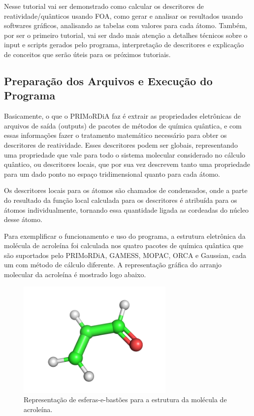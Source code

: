 \documentclass[a4paper,11pt]{refart}
\begin{document}
Nesse tutorial vai ser demonstrado como calcular os descritores de reatividade/quânticos usando FOA, como gerar e analisar os resultados usando softwares gráficos, analisando as tabelas com valores para cada átomo. Também, por ser o primeiro tutorial, vai ser dado mais atenção a detalhes técnicos sobre o input e scripts gerados pelo programa, interpretação de descritores e explicação de conceitos que serão úteis para os próximos tutoriais.

\subsection{Preparação dos Arquivos e Execução do Programa}

Basicamente, o que o PRIMoRDiA faz é extrair as propriedades eletrônicas de arquivos de saída (outputs) de pacotes de métodos de química quântica, e com essas informações fazer o tratamento matemático necessário para obter os descritores de reatividade. Esses descritores podem ser globais, representando uma propriedade que vale para todo o sistema molecular considerado no cálculo quântico, ou descritores locais, que por sua vez descrevem tanto uma propriedade para um dado ponto no espaço tridimensional quanto para cada átomo. 

Os descritores locais para os átomos são chamados de condensados, onde a parte do resultado da função local calculada para os descritores é atribuída para os átomos individualmente, tornando essa quantidade ligada as cordeadas do núcleo desse átomo.

Para exemplificar o funcionamento e uso do programa, a estrutura eletrônica da molécula de acroleína foi calculada nos quatro pacotes de química quântica que são suportados pelo PRIMoRDiA, GAMESS, MOPAC, ORCA e Gaussian, cada um com método de cálculo diferente. A representação gráfica do arranjo molecular da acroleína é mostrado logo abaixo.


\hspace*{-\leftmarginwidth}
\begin{minipage}{\fullwidth}
\begin{figure}[H]
\begin{center}
\includegraphics[width=3in]{images/img0}
\caption{Representação de esferas-e-bastões para a estrutura da molécula de acroleína.}
\label{fig_tut1_1}
\end{center}
\end{figure}
\end{minipage}	
\end{document}
